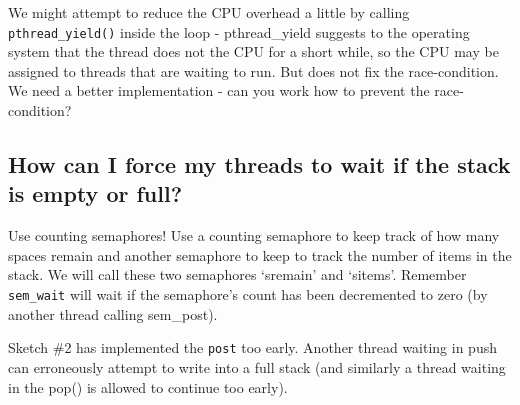 We might attempt to reduce the CPU overhead a little by calling
\texttt{pthread\_yield()} inside the loop - pthread\_yield suggests to
the operating system that the thread does not the CPU for a short while,
so the CPU may be assigned to threads that are waiting to run. But does
not fix the race-condition. We need a better implementation - can you
work how to prevent the race-condition?

\subsection{How can I force my threads to wait if the stack is empty or
full?}\label{how-can-i-force-my-threads-to-wait-if-the-stack-is-empty-or-full}

Use counting semaphores! Use a counting semaphore to keep track of how
many spaces remain and another semaphore to keep to track the number of
items in the stack. We will call these two semaphores `sremain' and
`sitems'. Remember \texttt{sem\_wait} will wait if the semaphore's count
has been decremented to zero (by another thread calling sem\_post).

\begin{Shaded}
\begin{Highlighting}[]

 
  \NormalTok{, }\NormalTok{);}
  \NormalTok{, }\NormalTok{);}
\NormalTok{\}}


 

  
\end{Highlighting}
\end{Shaded}

Sketch \#2 has implemented the \texttt{post} too early. Another thread
waiting in push can erroneously attempt to write into a full stack (and
similarly a thread waiting in the pop() is allowed to continue too
early).

\begin{Shaded}
\begin{Highlighting}[]
 
   
\NormalTok{\}}
  
\NormalTok{\}}
\end{Highlighting}
\end{Shaded}

